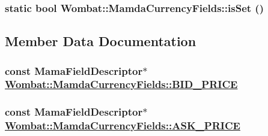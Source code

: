 \hypertarget{classWombat_1_1MamdaCurrencyFields_eba78583c0f73b030652ec0aa450d7f4}{
\subsubsection[isSet]{\setlength{\rightskip}{0pt plus 5cm}static bool Wombat::Mamda\-Currency\-Fields::is\-Set ()}}
\label{classWombat_1_1MamdaCurrencyFields_eba78583c0f73b030652ec0aa450d7f4}




\subsection{Member Data Documentation}
\hypertarget{classWombat_1_1MamdaCurrencyFields_324029c861a3ca277fd858fad9b97905}{
\subsubsection[BID\_\-PRICE]{\setlength{\rightskip}{0pt plus 5cm}const Mama\-Field\-Descriptor$\ast$ \hyperlink{classWombat_1_1MamdaCurrencyFields_324029c861a3ca277fd858fad9b97905}{Wombat::Mamda\-Currency\-Fields::BID\_\-PRICE}}}
\label{classWombat_1_1MamdaCurrencyFields_324029c861a3ca277fd858fad9b97905}


\hypertarget{classWombat_1_1MamdaCurrencyFields_7945ee0d8d4fb868b6d891122d535599}{
\subsubsection[ASK\_\-PRICE]{\setlength{\rightskip}{0pt plus 5cm}const Mama\-Field\-Descriptor$\ast$ \hyperlink{classWombat_1_1MamdaCurrencyFields_7945ee0d8d4fb868b6d891122d535599}{Wombat::Mamda\-Currency\-Fields::ASK\_\-PRICE}}}
\label{classWombat_1_1MamdaCurrencyFields_7945ee0d8d4fb868b6d891122d535599}


